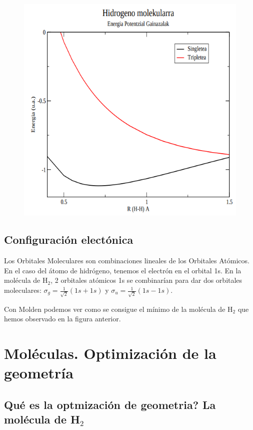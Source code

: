 \documentclass{tufte-book}
\begin{document}
\begin{figure}
\centering
\includegraphics[scale=0.7]{PES_H2.png}
\end{figure}


\section{Configuración electónica}
Los Orbitales Moleculares son combinaciones lineales de los Orbitales Atómicos. 
En el caso del átomo de hidrógeno, tenemos el electrón en el orbital 1s. En la
molécula de H$_2$, 2 orbitales atómicos 1s se combinarían para dar dos orbitales
moleculares: $\sigma_g=\frac{1}{\sqrt{2}}(1s+1s)$ y
$\sigma_u=\frac{1}{\sqrt{2}}(1s-1s)$.

Con Molden podemos ver como se consigue el mínimo de la molécula de H$_2$ que 
hemos observado en la figura anterior.


\chapter{Moléculas. Optimización de la geometría}

\section{Qué es la optmización de geometria? La molécula de H$_2$}
\end{document}

